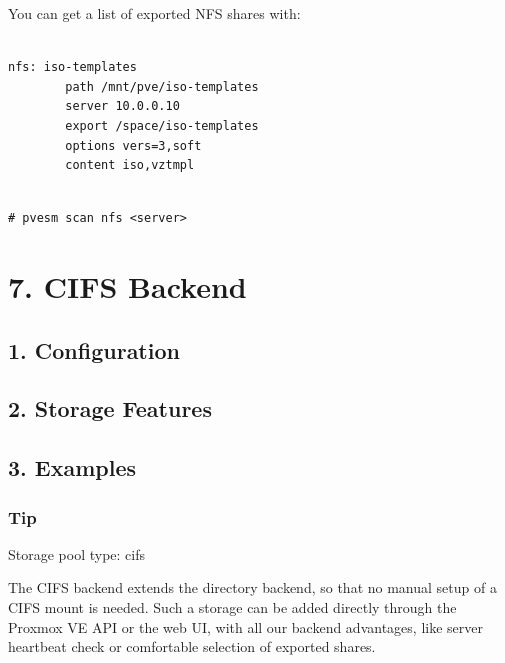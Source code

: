 You can get a list of exported NFS shares with:

\begin{lstlisting}

nfs: iso-templates
        path /mnt/pve/iso-templates
        server 10.0.0.10
        export /space/iso-templates
        options vers=3,soft
        content iso,vztmpl

\end{lstlisting}

\begin{lstlisting}

# pvesm scan nfs <server>

\end{lstlisting}

\begin{table}[htbp]

\centering

\begin{tabular}

\end{tabular}

\end{table}


\section{7. CIFS Backend}

\subsection{1. Configuration}

\subsection{2. Storage Features}

\subsection{3. Examples}

\subsubsection{Tip}

Storage pool type: cifs

The CIFS backend extends the directory backend, so that no manual setup of a CIFS mount is needed. Such a storage can be added directly through the Proxmox VE API or the web UI, with all our backend advantages, like server heartbeat check or comfortable selection of exported shares.

